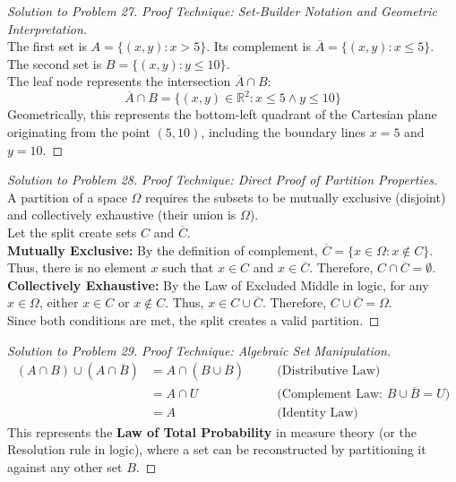 \documentclass[12pt]{article}
\theoremstyle{definition}
\begin{document}
\begin{proof}[Solution to Problem 27]
\textit{Proof Technique: Set-Builder Notation and Geometric Interpretation.} \\
The first set is $A = \{(x,y) : x > 5\}$. Its complement is $\overline{A} = \{(x,y) : x \le 5\}$. \\
The second set is $B = \{(x,y) : y \le 10\}$. \\
The leaf node represents the intersection $\overline{A} \cap B$:
\[ \overline{A} \cap B = \{(x,y) \in \mathbb{R}^2 : x \le 5 \land y \le 10\} \]
Geometrically, this represents the bottom-left quadrant of the Cartesian plane originating from the point $(5, 10)$, including the boundary lines $x=5$ and $y=10$.
\end{proof}

\begin{proof}[Solution to Problem 28]
\textit{Proof Technique: Direct Proof of Partition Properties.} \\
A partition of a space $\Omega$ requires the subsets to be mutually exclusive (disjoint) and collectively exhaustive (their union is $\Omega$). \\
Let the split create sets $C$ and $\overline{C}$. \\
\textbf{Mutually Exclusive:} By the definition of complement, $\overline{C} = \{x \in \Omega : x \notin C\}$. Thus, there is no element $x$ such that $x \in C$ and $x \in \overline{C}$. Therefore, $C \cap \overline{C} = \emptyset$. \\
\textbf{Collectively Exhaustive:} By the Law of Excluded Middle in logic, for any $x \in \Omega$, either $x \in C$ or $x \notin C$. Thus, $x \in C \cup \overline{C}$. Therefore, $C \cup \overline{C} = \Omega$. \\
Since both conditions are met, the split creates a valid partition.
\end{proof}

\begin{proof}[Solution to Problem 29]
\textit{Proof Technique: Algebraic Set Manipulation.}
\begin{align*}
(A \cap B) \cup (A \cap \overline{B}) &= A \cap (B \cup \overline{B}) \quad &&\text{(Distributive Law)} \\
&= A \cap U \quad &&\text{(Complement Law: } B \cup \overline{B} = U \text{)} \\
&= A \quad &&\text{(Identity Law)}
\end{align*}
This represents the \textbf{Law of Total Probability} in measure theory (or the Resolution rule in logic), where a set can be reconstructed by partitioning it against any other set $B$.
\end{proof}
\end{document}
